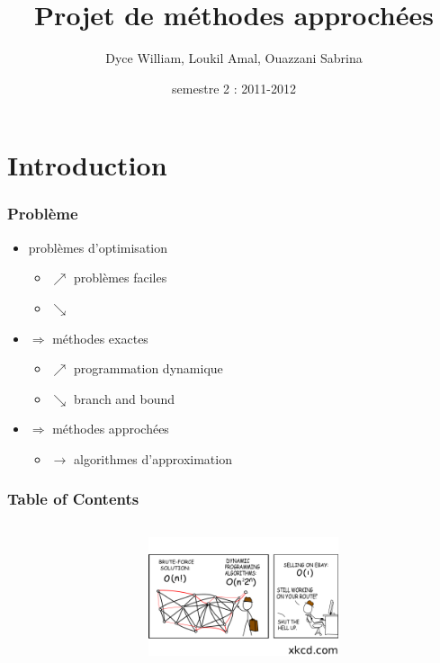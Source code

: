 \documentclass[french]{beamer}
\title{Projet de méthodes approchées}
\institute{M1 informatique UM2}
\author{Dyce William, Loukil Amal, Ouazzani Sabrina}
\date{semestre 2 : 2011-2012}
\begin{document}
\begin{frame}
  \titlepage
\end{frame}

\section{Introduction}

\begin{frame}
  \frametitle{Problème}
  \begin{itemize}
  \item problèmes d'optimisation 
    \begin{itemize}
    \item[] $\nearrow$ problèmes faciles
    \item[] $\searrow$ 
    \end{itemize}
  \item  $\Rightarrow$ méthodes exactes 
    \begin{itemize}
    \item[] $\nearrow$ programmation dynamique
    \item[] $\searrow$ branch and bound
    \end{itemize}

    
  \item  $\Rightarrow$ méthodes approchées
    \begin{itemize}
    \item[] $\longrightarrow$ algorithmes d'approximation
    \end{itemize}
  \end{itemize}
\end{frame}

\begin{frame}
  \frametitle{Table of Contents}
  \begin{columns}
    \begin{column}[]{5cm}
      \tableofcontents
    \end{column}
    \begin{column}[]{5cm}
      \begin{center}
        \includegraphics[height=3.5cm]{../images/commerce.png}
      \end{center}
    \end{column}
  \end{columns}
\end{frame}
\end{document}
